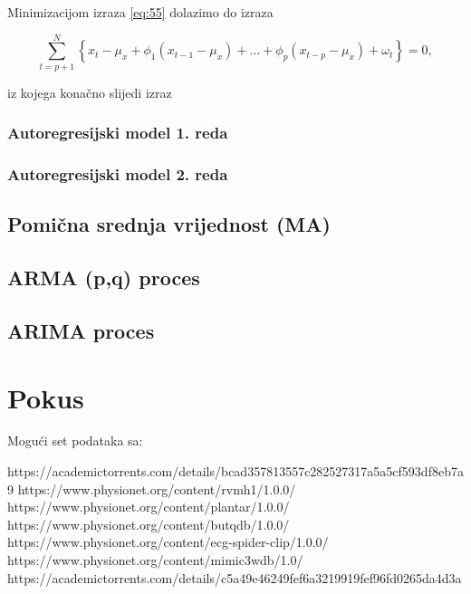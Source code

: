 \documentclass[a4paper,12pt,oneside]{memoir}
\begin{document}
            Minimizacijom izraza \eqref{eq:55} dolazimo do izraza
            
            \begin{equation}
                \displaystyle\sum_{t=p+1}^N\left\{x_t-\mu_x+\phi_1\left(x_{t-1}-\mu_x\right)+\ldots+\phi_p\left(x_{t-p}-\mu_x\right)+\omega_t\right\}=0,
            \end{equation}
            \label{subs:511}

            iz kojega konačno slijedi izraz


            \subsection{Autoregresijski model 1. reda}
            \label{subs:512}
            \subsection{Autoregresijski model 2. reda}
            \label{subs:513}




        \section{Pomična srednja vrijednost (MA)}

        \section{ARMA (p,q) proces}
        \section{ARIMA proces}
    \chapter{Pokus}
        Mogući set podataka sa:

        https://academictorrents.com/details/bcad357813557c282527317a5a5cf593df8eb7a9
        https://www.physionet.org/content/rvmh1/1.0.0/
        https://www.physionet.org/content/plantar/1.0.0/
        https://www.physionet.org/content/butqdb/1.0.0/
        https://www.physionet.org/content/ecg-spider-clip/1.0.0/
        https://www.physionet.org/content/mimic3wdb/1.0/
        https://academictorrents.com/details/c5a49e46249fef6a3219919fef96fd0265da4d3a
\end{document}
